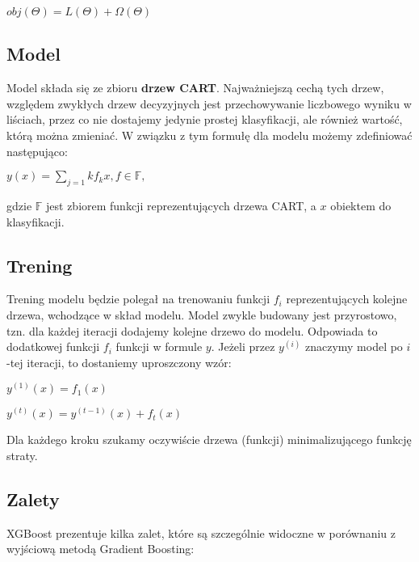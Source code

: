 \documentclass[a4paper,12p]{article}
\begin{document}
\begin{center}
	$obj(\Theta)=L(\Theta)+\Omega(\Theta)$
\end{center}

\subsection{Model}

Model składa się ze zbioru \textbf{drzew CART}. Najważniejszą cechą tych drzew, względem zwykłych drzew decyzyjnych jest przechowywanie liczbowego wyniku w liściach, przez co nie dostajemy jedynie prostej klasyfikacji, ale również wartość, którą można zmieniać. W związku z tym formułę dla modelu możemy zdefiniować następująco:

\begin{center}
	$y(x) = \sum_{j=1}{k} f_k{x}, f \in \mathbb{F},$
\end{center}

gdzie $\mathbb{F}$ jest zbiorem funkcji reprezentujących drzewa CART, a $x$ obiektem do klasyfikacji.

\subsection{Trening}

Trening modelu będzie polegał na trenowaniu funkcji $f_i$ reprezentujących kolejne drzewa, wchodzące w skład modelu. Model zwykle budowany jest przyrostowo, tzn. dla każdej iteracji dodajemy kolejne drzewo do modelu. Odpowiada to dodatkowej funkcji $f_i$ funkcji w formule $y$. Jeżeli przez $y^{(i)}$ znaczymy model po $i$-tej iteracji, to dostaniemy uproszczony wzór:

\begin{center}
	$y^{(1)}(x) = f_1(x)$
\end{center}

\begin{center}
	$y^{(t)}(x) = y^{(t-1)}(x) + f_t(x)$
\end{center}

Dla każdego kroku szukamy oczywiście drzewa (funkcji) minimalizującego funkcję straty.

\subsection{Zalety}

XGBoost prezentuje kilka zalet, które są szczególnie widoczne w porównaniu z wyjściową metodą Gradient Boosting:
\end{document}
